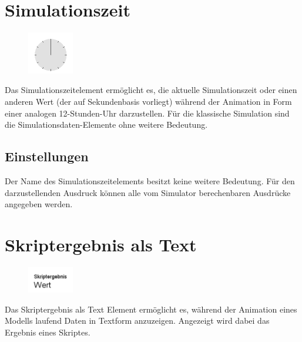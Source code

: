 \section{Simulationszeit}
\label{ref:ModelElementAnimationClock}

\begin{figure}
\vspace{-22pt}
\includegraphics[width=2cm]{imageModelElementAnimationClock.png}
\vspace{-22pt}
\end{figure}

Das Simulationszeitelement ermöglicht es, die aktuelle Simulationszeit oder einen anderen Wert
(der auf Sekundenbasis vorliegt) während der Animation in Form einer analogen 12-Stunden-Uhr darzustellen.
Für die klassische Simulation sind die Simulationsdaten-Elemente ohne weitere Bedeutung.

\subsection*{Einstellungen}

Der Name des Simulationszeitelements besitzt keine weitere Bedeutung.
Für den darzustellenden Ausdruck können alle vom Simulator berechenbaren Ausdrücke angegeben werden.


\section{Skriptergebnis als Text}
\label{ref:ModelElementAnimationTextJS}

\begin{figure}
\vspace{-22pt}
\includegraphics[width=2cm]{imageModelElementAnimationTextJS.png}
\vspace{-22pt}
\end{figure}

Das Skriptergebnis als Text Element ermöglicht es, während der Animation eines Modells laufend Daten in Textform anzuzeigen.
Angezeigt wird dabei das Ergebnis eines Skriptes.

